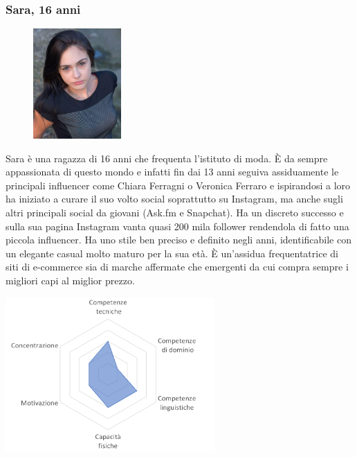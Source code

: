 \documentclass[12pt,a4paper]{report}
\begin{document}
\subsubsection*{Sara, 16 anni}
\begin{figure}
  \centering
  \includegraphics[width=0.3\textwidth]{"Images Latex/Personas/Sara"}
\end{figure}
Sara è una ragazza di 16 anni che frequenta l'istituto di moda. È  da sempre appassionata di questo mondo e infatti fin dai 13 anni seguiva assiduamente le principali influencer come Chiara Ferragni o Veronica Ferraro e ispirandosi a loro ha iniziato a curare il suo volto social soprattutto su Instagram, ma anche sugli altri principali social da giovani (Ask.fm e Snapchat). Ha un discreto successo e sulla sua pagina Instagram vanta quasi 200 mila follower rendendola di fatto una piccola influencer. Ha uno stile ben preciso e definito negli anni, identificabile con un elegante casual molto maturo per la sua età. È un'assidua frequentatrice di siti di e-commerce sia di marche affermate che emergenti da cui compra sempre i migliori capi al miglior prezzo.
\begin{center}
  \includegraphics[width=0.6\textwidth]{"Images Latex/Personas/Sara16"}
\end{center}

\newpage
\end{document}
